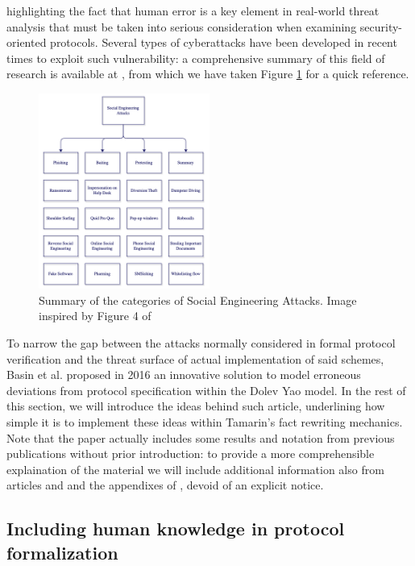 \documentclass{article}
\begin{document}
highlighting the fact that human error is a key element in real-world threat analysis that must be taken into serious consideration when examining security-oriented protocols. Several types of cyberattacks have been developed in recent times to exploit such vulnerability: a comprehensive summary of this field of research is available at \cite{Salahdine_2019}, from which we have taken Figure \ref{fig:social_engineering_attacks} for a quick reference.

\begin{figure}[htbp]
    \centering
    \includegraphics[width=0.5\textwidth]{images/socialengineeringattacks.png}
    \caption{Summary of the categories of Social Engineering Attacks. Image inspired by Figure 4 of \cite{Salahdine_2019}}
    \label{fig:social_engineering_attacks}
  \end{figure}
  
To narrow the gap between the attacks normally considered in formal protocol verification and the threat surface of actual implementation of said schemes, Basin et al. proposed in 2016 \cite{Basin_2016} an innovative solution to model erroneous deviations from protocol specification within the Dolev Yao model. In the rest of this section, we will introduce the ideas behind such article, underlining how simple it is to implement these ideas within Tamarin's fact rewriting mechanics. Note that the paper actually includes some results and notation from previous publications without prior introduction: to provide a more comprehensible explaination of the material we will include additional information also from articles \cite{Lowe_1997} and \cite{Basin_2015} and the appendixes of \cite{Basin_2016}, devoid of an explicit notice.

\subsection{Including human knowledge in protocol formalization}\label{sec:including_humans}
\end{document}
